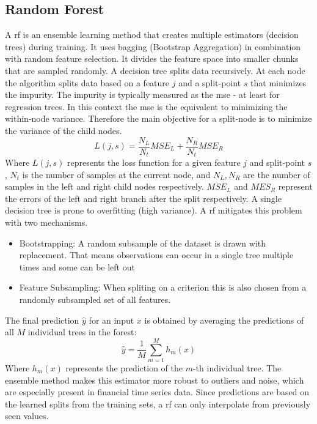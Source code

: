 \documentclass[12pt,twoside=false,a4paper,parskip]{scrbook}
\begin{document}
\subsection{Random Forest}
A \gls{rf} is an ensemble learning method that creates multiple estimators (decision trees) during training. It uses bagging (Bootstrap Aggregation) in combination with random feature selection. It divides the feature space into smaller chunks that are sampled randomly. A decision tree splits data recursively. At each node the algorithm splits data based on a feature $j$ and a split-point $s$ that minimizes the impurity. The impurity is typically measured as the \gls{mse} - at least for regression trees. In this context the \gls{mse} is the equivalent to minimizing the within-node variance. Therefore the main objective for a split-node is to minimize the variance of the child nodes. 
\begin{equation}
L(j, s) = \frac{N_L}{N_t} MSE_L + \frac{N_R}{N_t} MSE_R
\end{equation}
Where $L(j, s)$ represents the loss function for a given feature $j$ and split-point $s$, $N_t$ is the number of samples at the current node, and $N_L, N_R$ are the number of samples in the left and right child nodes respectively. $MSE_L$ and $MES_R$ represent the errors of the left and right branch after the split respectively. A single decision tree is prone to overfitting (high variance). A \gls{rf} mitigates this problem with two mechanisms.
\begin{itemize}
    \item Bootstrapping: A random subsample of the dataset is drawn with replacement. That means observations can occur in a single tree multiple times and some can be left out
    \item Feature Subsampling: When spliting on a criterion this is also chosen from a randomly subsampled set of all features. 
\end{itemize}
The final prediction $\hat{y}$ for an input $x$ is obtained by averaging the predictions of all $M$ individual trees in the forest:
\begin{equation}
\hat{y} = \frac{1}{M} \sum_{m=1}^{M} h_m(x)
\end{equation}
Where $h_m(x)$ represents the prediction of the $m$-th individual tree.
The ensemble method makes this estimator more robust to outliers and noise, which are especially present in financial time series data. Since predictions are based on the learned splits from the training sets, a \gls{rf} can only interpolate from previously seen values.
    
\end{document}
